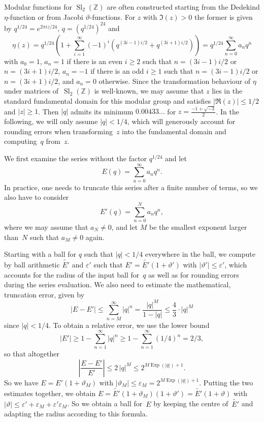 \documentclass [11pt]{article}
\newcommand {\appro}[1]{\widetilde {#1}}
\DeclareMathOperator{\Exp}{\operatorname {Exp}}
\newcommand {\Z}{\mathbb Z}
\renewcommand {\epsilon}{\varepsilon}
\renewcommand {\theta}{\vartheta}
\renewcommand {\leq}{\leqslant}
\renewcommand {\geq}{\geqslant}
\newcommand {\Sl}{\operatorname{Sl}}
\begin{document}
Modular functions for $\Sl_2 (\Z)$ are often constructed starting from the
Dedekind $\eta$-function or from Jacobi $\theta$-functions. For $z$ with
$\Im (z) > 0$ the former is given by
$q^{1/24} = e^{2 \pi i z / 24}$,
$q = (q^{1/24})^{24}$ and
\[
\eta (z) = q^{1/24} \left( 1 + \sum_{i=1}^\infty (-1)^i
   \left( q^{(3 i - 1) i / 2} + q^{(3 i + 1) i / 2} \right)
\right)
= q^{1/24} \sum_{n=0}^\infty a_n q^n
\]
with $a_0 = 1$,
$a_n = 1$ if there is an even $i \geq 2$ such that
$n = (3 i - 1) i / 2$ or $n = (3 i + 1) i / 2$,
$a_n = -1$ if there is an odd $i \geq 1$ such that
$n = (3 i - 1) i / 2$ or $n = (3 i + 1) i / 2$,
and $a_n = 0$ otherwise.
Since the transformation behaviour of $\eta$ under matrices of~$\Sl_2 (\Z)$
is well-known, we may assume that $z$ lies in the standard fundamental
domain for this modular group and satisfies $|\Re (z)| \leq 1/2$ and
$|z| \geq 1$. Then $|q|$ admits its minimum $0.00433\ldots$ for
$z = \frac {-1 + \sqrt {-3}}{2}$. In the following, we will only assume
$|q| < 1/4$, which will generously account for rounding errors when
transforming~$z$ into the fundamental domain and computing~$q$ from~$z$.

We first examine the series without the factor $q^{1/24}$ and let
\[
E (q) = \sum_{n=0}^\infty a_n q^n.
\]
In practice, one needs to truncate this series after a finite number of
terms, so we also have to consider
\[
E' (q) = \sum_{n=0}^N a_n q^n,
\]
where we may assume that $a_N \neq 0$, and let $M$ be the smallest exponent
larger than~$N$ such that $a_M \neq 0$ again.

Starting with a ball for $q$ such that $|q| < 1/4$ everywhere in the ball,
we compute by ball arithmetic $\appro {E'}$ and $\epsilon'$ such that
$E' = \appro {E'} (1 + \theta')$ with $|\theta'| \leq \epsilon'$, which
accounts for the radius of the input ball for~$q$ as well as for rounding
errors during the series evaluation.
We also need to estimate the mathematical, truncation error, given by
\[
|E - E'|
\leq \sum_{n = M}^\infty |q|^n
= \frac {|q|^M}{1 - |q|}
\leq \frac {4}{3} \cdot |q|^M
\]
since $|q| < 1/4$.
To obtain a relative error, we use the lower bound
\[
|E'|
\geq 1 - \sum_{n=1}^\infty |q|^n
\geq 1 - \sum_{n=1}^\infty (1/4)^n
= 2/3,
\]
so that altogether
\[
\left| \frac {E - E'}{E'} \right|
\leq 2 \, |q|^M
\leq 2^{M \Exp (|q|) + 1}.
\]
So we have $E = E' (1 + \theta_M)$ with
$|\theta_M| \leq \epsilon_M = 2^{M \Exp (|q|) + 1}$.
Putting the two estimates together, we obtain
$E = \appro {E'} (1 + \theta_M) (1 + \theta')
= \appro {E'} (1 + \theta)$
with
$|\theta| \leq \epsilon' + \epsilon_M + \epsilon' \epsilon_M$.
So we obtain a ball for~$E$ by keeping the centre of~$\appro {E'}$
and adapting the radius according to this formula.
\end{document}
